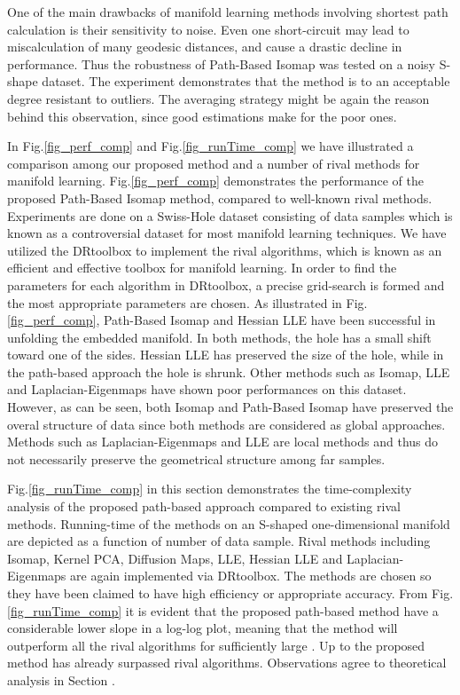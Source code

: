 \documentclass[10pt,journal,cspaper,compsoc]{IEEEtran}
\begin{document}
One of the main drawbacks of manifold learning methods involving shortest path calculation is their sensitivity to noise. Even one short-circuit may lead to miscalculation of many geodesic distances, and cause a drastic decline in performance. Thus the robustness of Path-Based Isomap was tested on a noisy S-shape dataset. The experiment demonstrates that the method is to an acceptable degree resistant to outliers. The averaging strategy might be again the reason behind this observation, since good estimations make for the poor ones.

In Fig.\ref{fig_perf_comp} and Fig.\ref{fig_runTime_comp} we have illustrated a comparison among our proposed method and a number of rival methods for manifold learning. Fig.\ref{fig_perf_comp} demonstrates the performance of the proposed Path-Based Isomap method, compared to  well-known rival methods. Experiments are done on a Swiss-Hole dataset consisting of  data samples which is known as a controversial dataset for most manifold learning techniques. We have utilized the DRtoolbox to implement the  rival algorithms, which is known as an efficient and effective toolbox for manifold learning. In order to find the parameters for each algorithm in DRtoolbox, a precise grid-search is formed and the most appropriate parameters are chosen. As illustrated in Fig.\ref{fig_perf_comp}, Path-Based Isomap and Hessian LLE have been successful in unfolding the embedded manifold. In both methods, the hole has a small shift toward one of the sides. Hessian LLE has preserved the size of the hole, while in the path-based approach the hole is shrunk. Other methods such as Isomap, LLE and Laplacian-Eigenmaps have shown poor performances on this dataset. However, as can be seen, both Isomap and Path-Based Isomap have preserved the overal structure of data since both methods are considered as global approaches. Methods such as Laplacian-Eigenmaps and LLE are local methods and thus do not necessarily preserve the geometrical structure among far samples.

Fig.\ref{fig_runTime_comp} in this section demonstrates the time-complexity analysis of the proposed path-based approach compared to  existing rival methods. Running-time of the methods on an S-shaped one-dimensional manifold are depicted as a function of number of data sample. Rival methods including Isomap, Kernel PCA, Diffusion Maps, LLE, Hessian LLE and Laplacian-Eigenmaps are again implemented via DRtoolbox. The methods are chosen so they have been claimed to have high efficiency or appropriate accuracy. From Fig.\ref{fig_runTime_comp} it is evident that the proposed path-based method have a considerable lower slope in a log-log plot, meaning that the method will outperform all the rival algorithms for sufficiently large . Up to  the proposed method has already surpassed  rival algorithms. Observations agree to theoretical analysis in Section .
\end{document}

